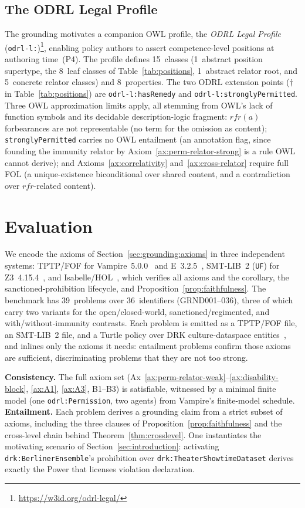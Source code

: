\documentclass{IOS-Book-Article}
\newcommand{\odrl}[1]{\texttt{odrl:#1}}
\theoremstyle{definition}
\begin{document}
\subsection{The ODRL Legal Profile}
\label{sec:completeness:profile}
The grounding motivates a companion OWL profile, the \emph{ODRL Legal
Profile} (\texttt{odrl-l:})\footnote{\url{https://w3id.org/odrl-legal/}},
enabling policy authors to assert competence-level positions at
authoring time~(P4). The profile defines 15~classes (1~abstract
position supertype, the 8~leaf classes of Table~\ref{tab:positions},
1~abstract relator root, and 5~concrete relator classes) and 8~properties.
The two ODRL extension points ($\dagger$ in
Table~\ref{tab:positions}) are \texttt{odrl-l:hasRemedy} and
\texttt{odrl-l:stronglyPermitted}. Three OWL approximation limits apply, all stemming from OWL's lack of function
symbols and its decidable description-logic fragment: $\mathit{rfr}(a)$
forbearances are not representable (no term for the omission as content);
\texttt{stronglyPermitted} carries no OWL entailment (an annotation flag, since
founding the immunity relator by Axiom~\ref{ax:perm-relator-strong} is a rule
OWL cannot derive); and Axioms~\ref{ax:correlativity}
and~\ref{ax:cross-relator} require full FOL (a unique-existence biconditional
over shared content, and a contradiction over $\mathit{rfr}$-related content).
\section{Evaluation}
\label{sec:validation}
We encode the axioms of Section~\ref{sec:grounding:axioms} in three
independent systems: TPTP/FOF for Vampire~5.0.0~\cite{kovacs2013first}
and E~3.2.5~\cite{schulz2013system}, SMT-LIB~2 (\texttt{UF}) for
Z3~4.15.4~\cite{de2008z3}, and Isabelle/HOL~\cite{nipkow2002isabelle},
which verifies all axioms and the corollary, the sanctioned-prohibition
lifecycle, and Proposition~\ref{prop:faithfulness}. The benchmark has
39~problems over 36~identifiers (GRND001--036), three of which carry two
variants for the open/closed-world, sanctioned/regimented, and
with/without-immunity contrasts. Each problem is emitted as a TPTP/FOF
file, an SMT-LIB~2 file, and a Turtle policy over DRK culture-dataspace
entities~\cite{isprs-archives-XLVIII-M-9-2025-1515-2025}, and inlines
only the axioms it needs: entailment problems confirm those axioms are
sufficient, discriminating problems that they are not too strong.

\noindent\textbf{Consistency.}
The full axiom set
(Ax~\ref{ax:perm-relator-weak}--\ref{ax:disability-block},
\ref{ax:A1}, \ref{ax:A3}, B1--B3) is satisfiable, witnessed by a
minimal finite model (one \odrl{Permission}, two agents) from Vampire's
finite-model schedule. \textbf{Entailment.} Each problem derives a grounding claim from a strict subset of axioms,
including the three clauses of Proposition~\ref{prop:faithfulness} and
the cross-level chain behind Theorem~\ref{thm:crosslevel}. One
instantiates the motivating scenario of Section~\ref{sec:introduction}:
activating \texttt{drk:BerlinerEnsemble}'s prohibition over
\texttt{drk:TheaterShowtimeDataset} derives exactly the Power that
licenses violation declaration.
\end{document}
